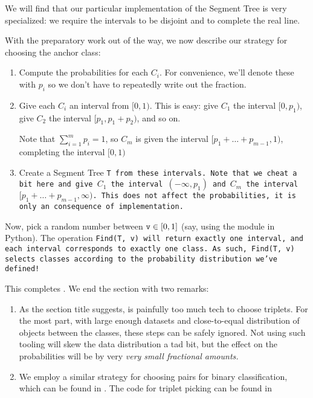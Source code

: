 We will find that our particular implementation of the Segment Tree is very specialized: we require the intervals to be disjoint and to complete the real line.

With the preparatory work out of the way, we now describe our strategy for choosing the anchor class:
\begin{enumerate}
    \item Compute the probabilities for each $C_i$. For convenience, we'll denote these with $p_i$ so we don't have to repeatedly write out the fraction.

    \item Give each $C_i$ an interval from $[0, 1)$. This is easy: give $C_1$ the interval $[0, p_1)$, give $C_2$ the interval $[p_1, p_1 + p_2)$, and so on.
    
    Note that $\sum_{i = 1}^m p_i = 1$, so $C_m$ is given the interval $[p_1 + \ldots + p_{m-1}, 1)$, completing the interval $[0, 1)$

    \item Create a Segment Tree \tt{T} from these intervals.
    Note that we cheat a bit here and give $C_1$ the interval $(-\infty, p_1)$ and $C_m$ the interval $[p_1 + \ldots + p_{m-1}, \infty)$.
    This does not affect the probabilities, it is only an consequence of implementation.
\end{enumerate}

Now, pick a random number between $\tt{v} \in [0,1]$ (say, using the \href{https://docs.python.org/3/library/random.html}{} module in Python).
The operation \tt{Find(T, v)} will return exactly one interval, and each interval corresponds to exactly one class.
As such, \tt{Find(T, v)} selects classes according to the probability distribution we've defined!

This completes .
We end the section with two remarks:
\begin{enumerate}
    \item As the section title suggests, is painfully too much tech to choose triplets.
    For the most part, with large enough datasets and close-to-equal distribution of objects between the classes, these steps can be safely ignored.
    Not using such tooling will skew the data distribution a tad bit, but the effect on the probabilities will be by very \it{very} small fractional amounts.

    \item We employ a similar strategy for choosing pairs for binary classification, which can be found in \href{https://github.com/nicholaspun/IZ-Net/blob/master/faceRecognition/PairPickerHelper.py}{}.
    The code for triplet picking can be found in \href{https://github.com/nicholaspun/IZ-Net/blob/master/faceRecognition/TripletPickerHelper.py}{}
\end{enumerate}
